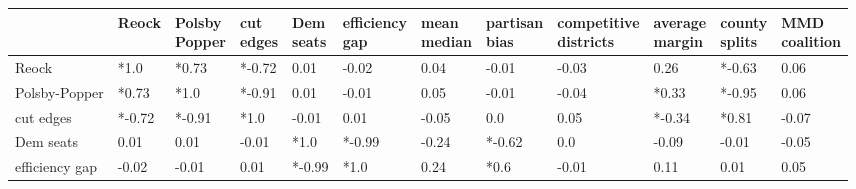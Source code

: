 \begin{tabular}{llllllllllll}
\toprule
{} &   Reock & \makecell{Polsby \\ Popper} & \makecell{cut \\ edges} & \makecell{Dem \\ seats} & \makecell{efficiency \\ gap} & \makecell{mean \\ median} & \makecell{partisan \\ bias} & \makecell{competitive \\ districts} & \makecell{average \\ margin} & \makecell{county \\ splits} & \makecell{MMD \\ coalition} \\
\midrule
Reock                 &    *1.0 &                       *0.73 &                  *-0.72 &                    0.01 &                        -0.02 &                      0.04 &                       -0.01 &                               -0.03 &                         0.26 &                      *-0.63 &                        0.06 \\
Polsby-Popper         &   *0.73 &                        *1.0 &                  *-0.91 &                    0.01 &                        -0.01 &                      0.05 &                       -0.01 &                               -0.04 &                        *0.33 &                      *-0.95 &                        0.06 \\
cut edges             &  *-0.72 &                      *-0.91 &                    *1.0 &                   -0.01 &                         0.01 &                     -0.05 &                         0.0 &                                0.05 &                       *-0.34 &                       *0.81 &                       -0.07 \\
Dem seats             &    0.01 &                        0.01 &                   -0.01 &                    *1.0 &                       *-0.99 &                     -0.24 &                      *-0.62 &                                 0.0 &                        -0.09 &                       -0.01 &                       -0.05 \\
efficiency gap        &   -0.02 &                       -0.01 &                    0.01 &                  *-0.99 &                         *1.0 &                      0.24 &                        *0.6 &                               -0.01 &                         0.11 &                        0.01 &                        0.05 \\

\end{tabular}
